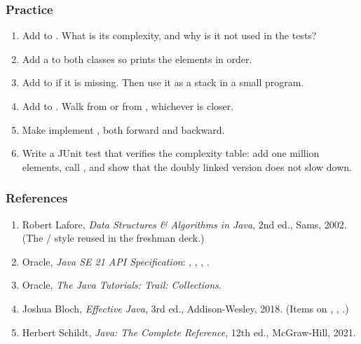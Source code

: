 \documentclass[aspectratio=169,10pt,compress]{beamer}
\begin{document}
\begin{frame}[t,fragile] \frametitle{Practice}
  \begin{enumerate}\small
    \item Add  to . What is its
          complexity, and why is it not used in the tests?
    \item Add a  to both classes so
           prints the elements in order.
    \item Add  to  if it is missing.
          Then use it as a stack in a small program.
    \item Add  to .
          Walk from  or from , whichever is closer.
    \item Make  implement ,
          both forward and backward.
    \item Write a JUnit test that verifies the complexity table: add one
          million elements, call , and show that the
          doubly linked version does not slow down.
  \end{enumerate}
\end{frame}




\begin{frame}[t,fragile] \frametitle{References}
  \begin{enumerate}\small
    \item Robert Lafore, \emph{Data Structures \& Algorithms in Java},
          2nd ed., Sams, 2002. (The /
          style reused in the freshman deck.)
    \item Oracle, \emph{Java SE 21 API Specification}:
          ,
          ,
          ,
          .
    \item Oracle, \emph{The Java Tutorials: Trail: Collections}.
    \item Joshua Bloch, \emph{Effective Java}, 3rd ed., Addison-Wesley,
          2018. (Items on , , .)
    \item Herbert Schildt, \emph{Java: The Complete Reference},
          12th ed., McGraw-Hill, 2021.
  \end{enumerate}
\end{frame}




\begin{frame}[t,fragile]
  \begin{center}
    \vspace{4cm}
  \end{center}
\end{frame}
\end{document}
